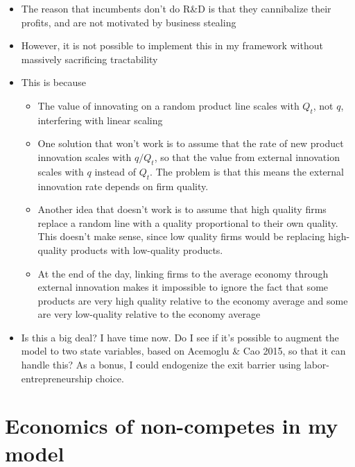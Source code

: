 \documentclass[11pt,english]{article}
\theoremstyle{remark}
\begin{document}
\begin{itemize}
	\item The reason that incumbents don't do R\&D is that they cannibalize their profits, and are not motivated by business stealing
	\item However, it is not possible to implement this in my framework without massively sacrificing tractability
	\item This is because 
	\begin{itemize}
		\item The value of innovating on a random product line scales with $Q_t$, not $q$, interfering with linear scaling
		\item One solution that won't work is to assume that the rate of new product innovation scales with $q/Q_t$, so that the value from external innovation scales with $q$ instead of $Q_t$. The problem is that this means the external innovation rate depends on firm quality. 
		\item Another idea that doesn't work is to assume that high quality firms replace a random line with a quality proportional to their own quality. This doesn't make sense, since low quality firms would be replacing high-quality products with low-quality products.
		\item At the end of the day, linking firms to the average economy through external innovation makes it impossible to ignore the fact that some products are very high quality relative to the economy average and some are very low-quality relative to the economy average
	\end{itemize}
	\item Is this a big deal? I have time now. Do I see if it's possible to augment the model to two state variables, based on Acemoglu \& Cao 2015, so that it can handle this? As a bonus, I could endogenize the exit barrier using labor-entrepreneurship choice. 
\end{itemize}

\section*{Economics of non-competes in my model}
\end{document}
